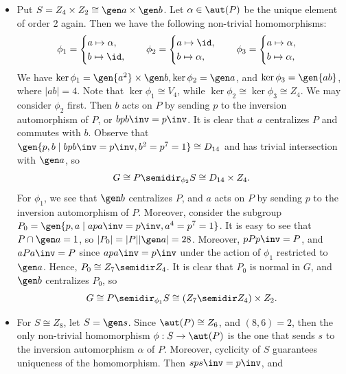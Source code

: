 \begin{solalph}
\begin{itemize}
        \[G \cong P \semidir_{\phi_1} S \cong D_{14} \times Z_2 \times Z_2.\]
        \item Put $S = Z_4 \times Z_2 \cong \gen a \times \gen b$. Let $\alpha \in \aut(P)$ be the unique element of order 2 again. Then we have the following non-trivial homomorphisms:
        \[\phi_1 =
        \begin{cases}
            a \mapsto \alpha, \\
            b \mapsto \id,
        \end{cases} \quad
        \phi_2 = 
        \begin{cases}
            a \mapsto \id, \\
            b \mapsto \alpha,
        \end{cases} \quad
        \phi_3 =
        \begin{cases}
            a \mapsto \alpha, \\
            b \mapsto \alpha,
        \end{cases}\]
        We have $\ker\phi_1 = \gen{a^2} \times \gen b, \ker\phi_2 = \gen a$, and $\ker\phi_3 = \gen{ab}$, where $|ab| = 4$. Note that $\ker\phi_1 \cong V_4$, while $\ker\phi_2 \cong \ker\phi_3 \cong Z_4$. We may consider $\phi_2$ first. Then $b$ acts on $P$ by sending $p$ to the inversion automorphism of $P$, or $bpb\inv = p\inv$. It is clear that $a$ centralizes $P$ and commutes with $b$. Observe that $\gen{p, b \mid bpb\inv = p\inv, b^2 = p^7 = 1} \cong D_{14}$ and has trivial intersection with $\gen a$, so
        \[G \cong P \semidir_{\phi_2} S \cong D_{14} \times Z_4.\]
        For $\phi_1$, we see that $\gen b$ centralizes $P$, and $a$ acts on $P$ by sending $p$ to the inversion automorphism of $P$. Moreover, consider the subgroup $P_0 = \gen{p, a \mid apa\inv = p\inv, a^4 = p^7 = 1}$. It is easy to see that $P \cap \gen a = 1$, so $|P_0| = |P||\gen a| = 28$. Moreover, $pPp\inv = P$, and $aPa\inv = P$ since $apa\inv = p\inv$ under the action of $\phi_1$ restricted to $\gen a$. Hence, $P_0 \cong Z_7 \semidir Z_4$. It is clear that $P_0$ is normal in $G$, and $\gen b$ centralizes $P_0$, so
        \[G \cong P \semidir_{\phi_1} S \cong (Z_7 \semidir Z_4) \times Z_2.\]
        \item For $S \cong Z_8$, let $S = \gen s$. Since $\aut(P) \cong Z_6$, and $(8, 6) = 2$, then the only non-trivial homomorphism $\phi : S \to \aut(P)$ is the one that sends $s$ to the inversion automorphism $\alpha$ of $P$. Moreover, cyclicity of $S$ guarantees uniqueness of the homomorphism. Then $sps\inv = p\inv$, and

\end{itemize}
\end{solalph}
